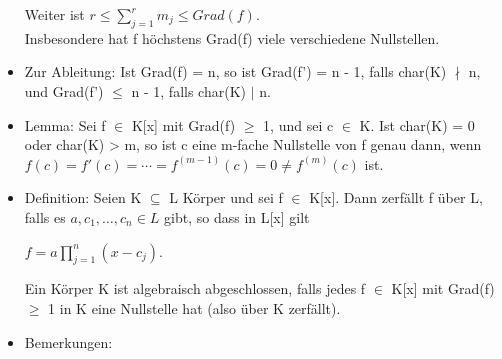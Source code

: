 \begin{itemize}
Weiter ist $r \le \sum\nolimits_{j=1}^{r}m_j \le Grad(f)$.\\
Insbesondere hat f höchstens Grad(f) viele verschiedene Nullstellen.
\item Zur Ableitung: Ist Grad(f) = n, so ist Grad(f') = n - 1, falls char(K) $\nmid$ n, und Grad(f') $\le$ n - 1, falls char(K) $\mid$ n.
\item Lemma: Sei f $\in$ K[x] mit Grad(f) $\ge$ 1, und sei c $\in$ K. Ist char(K) = 0 oder char(K) > m, so ist c eine m-fache Nullstelle von f genau dann, wenn $f(c) = f'(c) = \cdots = f^{(m-1)}(c) = 0 \neq f^{(m)}(c)$ ist.
\item Definition: Seien K $\subseteq$ L Körper und sei f $\in$ K[x]. Dann zerfällt f über L, falls es $a, c_1, …, c_n \in L$ gibt, so dass in L[x] gilt
\begin{center}
$f = a \prod\limits_{j=1}^{n}(x - c_j)$.
\end{center}
Ein Körper K ist algebraisch abgeschlossen, falls jedes f $\in$ K[x] mit Grad(f) $\ge$ 1 in K eine Nullstelle hat (also über K zerfällt).
\item Bemerkungen:
\end{itemize}

